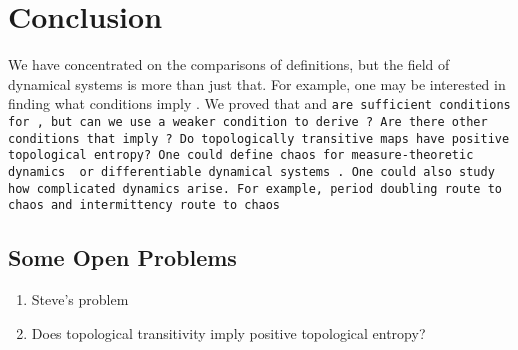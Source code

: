 \documentclass[12pt,twoside,draft]{book}
\begin{document}
\chapter{Conclusion}
We have concentrated on the comparisons of definitions, but the field of dynamical systems is more than just that.
For example, one may be interested in finding what conditions imply \sdic.
We proved that \dpp and \tt are sufficient conditions for \sdic, but can we use a weaker condition to derive \sdic?
Are there other conditions that imply \sdic?
Do topologically transitive maps have positive topological entropy?
One could define chaos for measure-theoretic dynamics \citep{downarowicz} or differentiable dynamical systems \citep{ruellebook}.
One could also study how complicated dynamics arise.
For example, period doubling route to chaos and intermittency route to chaos \citep{sternbergbook}

\section{Some Open Problems}
\begin{enumerate}
  \item Steve's problem
  \item Does topological transitivity imply positive topological entropy?
\end{enumerate}
 



\printindex
\end{document}
